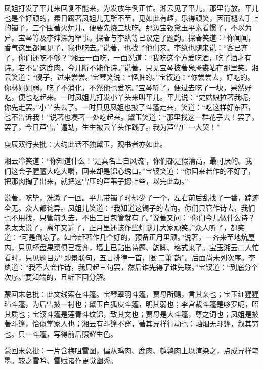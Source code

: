\begin{parag}


    凤姐打发了平儿来回复不能来，为发放年例正忙。湘云见了平儿，那里肯放。平儿也是个好顽的，素日跟著凤姐儿无所不至，见如此有趣，乐得顽笑，因而褪去手上的镯子，三个围著火炉儿，便要先烧三块吃。那边宝钗黛玉平素看惯了，不以为异，宝琴等及李婶深为罕事。探春与李纨等已议定了题韵。探春笑道：“你闻闻，香气这里都闻见了，我也吃去。”说著，也找了他们来。李纨也随来说：“客已齐了，你们还吃不够？”湘云一面吃，一面说道：“我吃这个方爱吃酒，吃了酒才有诗。若不是这鹿肉，今儿断不能作诗。”说著，只见宝琴披著凫靥裘站在那里笑。湘云笑道：“傻子，过来尝尝。”宝琴笑说：“怪脏的。”宝钗道：“你尝尝去，好吃的。你林姐姐弱，吃了不消化，不然他也爱吃。”宝琴听了，便过去吃了一块，果然好吃，便也吃起来。一时凤姐儿打发小丫头来叫平儿。平儿说：“史姑娘拉著我呢，你先走罢。”小丫头去了。一时只见凤姐也披了斗篷走来，笑道：“吃这样好东西，也不告诉我！”说著也凑著一处吃起来。黛玉笑道：“那里找这一群花子去！罢了，罢了，今日芦雪广遭劫，生生被云丫头作践了。我为芦雪广一大哭！”\begin{note}庚辰双行夹批：大约此话不独黛玉，观书者亦如此。\end{note}湘云冷笑道：“你知道什么！‘是真名士自风流’，你们都是假清高，最可厌的。我们这会子腥膻大吃大嚼，回来却是锦心绣口。”宝钗笑道：“你回来若作的不好了，把那肉掏了出来，就把这雪压的芦苇子揌上些，以完此劫。”
\end{parag}


\begin{parag}


    说著，吃毕，洗漱了一回。平儿带镯子时却少了一个，左右前后乱找了一番，踪迹全无。众人都诧异。凤姐儿笑道：“我知道这镯子的去向。你们只管作诗去，我们也不用找，只管前头去，不出三日包管就有了。”说著又问：“你们今儿做什么诗？老太太说了，离年又近了，正月里还该作些灯谜儿大家顽笑。”众人听了，都笑道：“可是倒忘了。如今赶著作几个好的，预备正月里顽。”说著，一齐来至地炕屋内，只见杯盘果菜俱已摆齐，墙上已贴出诗题、韵脚、格式来了。宝玉湘云二人忙看时，只见题目是“即景联句，五言排律一首，限‘二萧’韵”。后面尚未列次序。李纨道：“我不大会作诗，我只起三句罢，然后谁先得了谁先联。”宝钗道：“到底分个次序。”要知端的，且听下回分解。
\end{parag}

\begin{parag}

    \begin{note}蒙回末总批：此文线索在斗篷。宝琴翠羽斗篷，贾母所赐，言其亲也；宝玉红猩猩毡斗篷，为后雪披一衬也；黛玉白狐皮斗篷，明其弱也；李宫裁斗篷是哆罗呢，昭其质也；宝钗斗篷是莲青斗纹锦，致其文也；贾母是大斗篷，尊之词也；凤姐是披著斗篷，恰似掌家人也；湘云有斗篷不穿，著其异样行动也；岫烟无斗篷，叙其穷也。只一斗篷，写得前后照耀生色。\end{note}
\end{parag}


\begin{parag}


    \begin{note}蒙回末总批：一片含梅咀雪图，偏从鸡肉、鹿肉、鹌鹑肉上以渲染之，点成异样笔墨。较之雪吟、雪赋诸作更觉幽秀。\end{note}
\end{parag}

